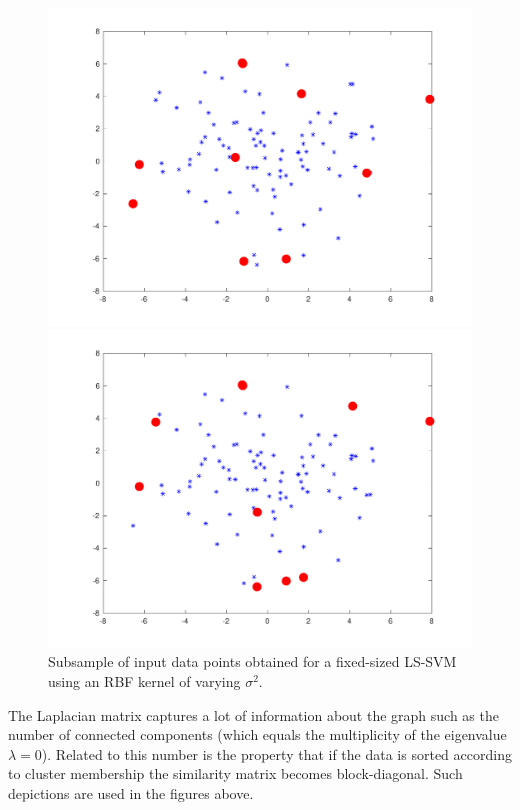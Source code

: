 \begin{figure}
\begin{minipage}{\linewidth}
    \caption*{$\sigma^2=1.0$}
\includegraphics[width=\linewidth]{../src/figures/fixedsize/fixedsize_1000}
    \caption*{$\sigma^2=10.0$}
\includegraphics[width=\linewidth]{../src/figures/fixedsize/fixedsize_10000}
    \caption*{$\sigma^2=100.0$}
\end{minipage}
\caption{Subsample of input data points obtained for a fixed-sized LS-SVM using an RBF kernel of varying $\sigma^2$.}
\label{fixedsample}
\end{figure}

\par The Laplacian matrix captures a lot of information about the graph such as the number of connected components (which equals the multiplicity of the eigenvalue $\lambda=0$). Related to this number is the property that if the data is sorted according to cluster membership the similarity matrix becomes block-diagonal. Such depictions are used in the figures above. 

